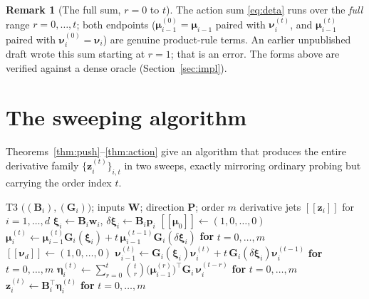 \documentclass[11pt]{article}
\newcommand{\jet}[1]{[\![ #1 ]\!]}   %
\theoremstyle{definition}
\newtheorem{remark}{Remark}
\theoremstyle{plain}
\begin{document}
\begin{remark}[The full sum, $r = 0$ to $t$]
\label{rem:fullsum}
The action sum \eqref{eq:deta} runs over the \emph{full} range $r = 0, \dots, t$; both endpoints
($\boldsymbol\mu_{i-1}^{(0)} = \boldsymbol\mu_{i-1}$ paired with $\boldsymbol\nu_i^{(t)}$, and
$\boldsymbol\mu_{i-1}^{(t)}$ paired with $\boldsymbol\nu_i^{(0)} = \boldsymbol\nu_i$) are genuine
product-rule terms. An earlier unpublished draft wrote this sum starting at $r=1$; that is an error.
The forms above are verified against a dense oracle (Section~\ref{sec:impl}).
\end{remark}

\section{The sweeping algorithm}
\label{sec:algo}

Theorems~\ref{thm:push}--\ref{thm:action} give an algorithm that produces the entire derivative
family $\{\mathbf z_i^{(t)}\}_{i,t}$ in two sweeps, exactly mirroring ordinary probing but carrying
the order index $t$.

\begin{algorithm}[h]
\caption{Symmetric probe derivatives of a Tucker tensor train}
\label{alg:sweep}
\begin{algorithmic}[1]
\Require T3 $\big((\mathbf B_i),(\mathbf G_i)\big)$; inputs $\mathbf W$; direction $\mathbf P$; order $m$
\Ensure derivative jets $\jet{\mathbf z_i}$ for $i=1,\dots,d$
 
  \State $\boldsymbol\xi_i \gets \mathbf B_i \mathbf w_i$,\quad
         $\delta\boldsymbol\xi_i \gets \mathbf B_i \mathbf p_i$
\EndFor
\State $\jet{\boldsymbol\mu_0} \gets (1,0,\dots,0)$
 
  \State $\boldsymbol\mu_i^{(t)} \gets \boldsymbol\mu_{i-1}^{(t)}\mathbf G_i(\boldsymbol\xi_i)
         + t\,\boldsymbol\mu_{i-1}^{(t-1)}\mathbf G_i(\delta\boldsymbol\xi_i)$ \textbf{ for } $t=0,\dots,m$
\EndFor
\State $\jet{\boldsymbol\nu_d} \gets (1,0,\dots,0)$
 
  \State $\boldsymbol\nu_{i-1}^{(t)} \gets \mathbf G_i(\boldsymbol\xi_i)\boldsymbol\nu_i^{(t)}
         + t\,\mathbf G_i(\delta\boldsymbol\xi_i)\boldsymbol\nu_i^{(t-1)}$ \textbf{ for } $t=0,\dots,m$
\EndFor
{} 
  \State $\boldsymbol\eta_i^{(t)} \gets \sum_{r=0}^{t}\binom{t}{r}
         \big(\boldsymbol\mu_{i-1}^{(r)}\big)^\top \mathbf G_i\,\boldsymbol\nu_i^{(t-r)}$ \textbf{ for } $t=0,\dots,m$
  \State $\mathbf z_i^{(t)} \gets \mathbf B_i^\top \boldsymbol\eta_i^{(t)}$ \textbf{ for } $t=0,\dots,m$
\EndFor
\end{algorithmic}
\end{algorithm}
\end{document}
